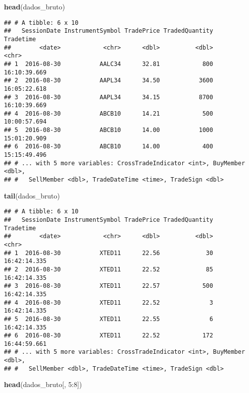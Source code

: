 \documentclass[]{article}
\newenvironment{Shaded}{\begin{snugshade}}{\end{snugshade}}
\newcommand{\KeywordTok}[1]{\textcolor[rgb]{0.13,0.29,0.53}{\textbf{{#1}}}}
\newcommand{\DecValTok}[1]{\textcolor[rgb]{0.00,0.00,0.81}{{#1}}}
\newcommand{\NormalTok}[1]{{#1}}
\begin{document}
\begin{Shaded}
\begin{Highlighting}[]
\KeywordTok{head}\NormalTok{(dados_bruto)}
\end{Highlighting}
\end{Shaded}

\begin{verbatim}
## # A tibble: 6 x 10
##   SessionDate InstrumentSymbol TradePrice TradedQuantity    Tradetime
##        <date>            <chr>      <dbl>          <dbl>        <chr>
## 1  2016-08-30           AALC34      32.81            800 16:10:39.669
## 2  2016-08-30           AAPL34      34.50           3600 16:05:22.618
## 3  2016-08-30           AAPL34      34.15           8700 16:10:39.669
## 4  2016-08-30           ABCB10      14.21            500 10:00:57.694
## 5  2016-08-30           ABCB10      14.00           1000 15:01:20.909
## 6  2016-08-30           ABCB10      14.00            400 15:15:49.496
## # ... with 5 more variables: CrossTradeIndicator <int>, BuyMember <dbl>,
## #   SellMember <dbl>, TradeDateTime <time>, TradeSign <dbl>
\end{verbatim}

\begin{Shaded}
\begin{Highlighting}[]
\KeywordTok{tail}\NormalTok{(dados_bruto)}
\end{Highlighting}
\end{Shaded}

\begin{verbatim}
## # A tibble: 6 x 10
##   SessionDate InstrumentSymbol TradePrice TradedQuantity    Tradetime
##        <date>            <chr>      <dbl>          <dbl>        <chr>
## 1  2016-08-30           XTED11      22.56             30 16:42:14.335
## 2  2016-08-30           XTED11      22.52             85 16:42:14.335
## 3  2016-08-30           XTED11      22.57            500 16:42:14.335
## 4  2016-08-30           XTED11      22.52              3 16:42:14.335
## 5  2016-08-30           XTED11      22.55              6 16:42:14.335
## 6  2016-08-30           XTED11      22.52            172 16:44:59.661
## # ... with 5 more variables: CrossTradeIndicator <int>, BuyMember <dbl>,
## #   SellMember <dbl>, TradeDateTime <time>, TradeSign <dbl>
\end{verbatim}

\begin{Shaded}
\begin{Highlighting}[]
\KeywordTok{head}\NormalTok{(dados_bruto[, }\DecValTok{5}\NormalTok{:}\DecValTok{8}\NormalTok{])}
\end{Highlighting}
\end{Shaded}
\end{document}
